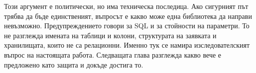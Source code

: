Този аргумент е политически, но има техническа последица. Ако сигурният път трябва да
бъде единственият, въпросът е какво може една библиотека да направи невъзможно.
Предупреждението говори за SQL и за стойности на параметри. То не разглежда имената
на таблици и колони, структурата на заявката и хранилищата, които не са релационни.
Именно тук се намира изследователският въпрос на настоящата работа. Следващата глава
разглежда какво вече е предложено като защита и докъде достига то.
